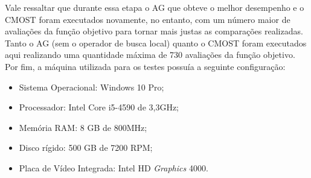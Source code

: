 Vale ressaltar que durante essa etapa o AG que obteve o melhor desempenho e o CMOST foram executados novamente, no entanto, com um número maior de avaliações da função objetivo para tornar mais justas as comparações realizadas. Tanto o AG (sem o operador de busca local) quanto o CMOST foram executados aqui realizando uma quantidade máxima de 730 avaliações da função objetivo. Por fim, a máquina utilizada para os testes possuía a seguinte configuração: 

\begin{itemize}
\item Sistema Operacional: Windows 10 Pro;
\item Processador: Intel Core i5-4590 de 3,3GHz;
\item Memória RAM: 8 GB de 800MHz;
\item Disco rígido: 500 GB de 7200 RPM;
\item Placa de Vídeo Integrada: Intel HD \textit{Graphics} 4000.
\end{itemize}

